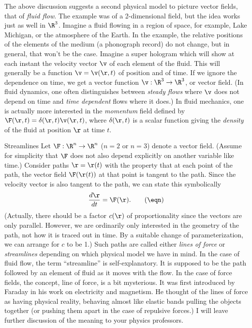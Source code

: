 The above discussion suggests a second physical model 
 to picture vector fields, that of {\it fluid flow}.
The example was of a 2-dimensional field, but the idea works
just as well in $\R^3$.  Imagine a fluid flowing in a region
of space, for example, Lake Michigan, or the atmosphere of
the Earth.  In the example, the relative positions of the elements
of the medium (a phonograph record) do not change, but in
general, that won't be the case.   Imagine a super hologram
which will show at each instant the velocity vector $\v$ of each
element of the fluid.   This will generally be a function
$\v = \v(\r, t)$ of position and of time.  If we ignore the
dependence on time, we get a vector function $\v:\R^3 \to
\R^3$, or vector field.   (In fluid dynamics, one often
distinguishes between {\it steady flows\/} where $\v$
does not depend on time and {\it time dependent\/}
flows where it does.)   In fluid mechanics, one is actually
more interested in the {\it momentum\/} field defined by 
$\F(\r,t) =  \delta(\r,t)\v(\r,t)$, where $\delta(\r,t)$ is a scalar function
giving the {\it density} of the fluid at position $\r$ at time $t$.    

\subhead Streamlines \endsubhead
Let $\F:\R^n \to \R^n$ ($n = 2$ or $n = 3$) denote a vector
field. (Assume for simplicity that $\F$ does not also depend explicitly
on another variable like time.)
   Consider paths  $\r = \r(t)$ with the property that
at each point of the path, the vector field $\F(\r(t))$
at that point is tangent to the path.  Since the velocity
vector is also tangent to the path, we can state this
symbolically
\nexteqn
$$
    \frac{d\r}{dt} = \F(\r).\tag\eqn
$$
(Actually, there should be a factor $c(\r)$ of proportionality
since the vectors are only parallel.  However, we are ordinarily
only interested in the geometry of the path, not how
it is traced out in time.   By a suitable change
of parameterization, we can arrange for $c$ to be 1.) 
Such paths are called either {\it lines of force\/}
or {\it streamlines\/} depending on which physical model
we have in mind.  In the case of fluid flow, the term
``streamline'' is self-explanatory.  It is supposed to
be the path followed by an element of fluid as it moves
with the flow.  
 In the case of
force fields, the concept, line of force, is a bit
mysterious.  It was first introduced by Faraday in his work
on electricity and magnetism.  He thought of the lines of
force as having physical reality, behaving almost like
elastic bands pulling the objects together (or pushing them
apart in the case of repulsive forces.)   I will leave
further discussion of the meaning to your physics professors. 

